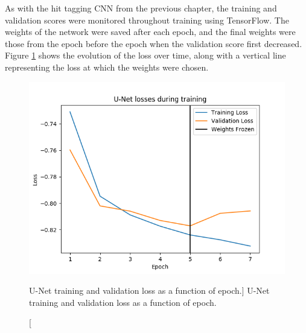 As with the hit tagging CNN from the previous chapter, the training and
validation scores were monitored throughout training using TensorFlow. The
weights of the network were saved after each epoch, and the final weights were
those from the epoch before the epoch when the validation score first decreased.
Figure \ref{fig:unet_loss} shows the evolution of the loss over time, along with
a vertical line representing the loss at which the weights were chosen.
\begin{figure}
	\centering
	\includegraphics[width=\textwidth]{figures/unet_loss.png}
	\caption
	[U-Net training and validation loss as a function of epoch.]
	{U-Net training and validation loss as a function of epoch.}
	\label{fig:unet_loss}
\end{figure}

